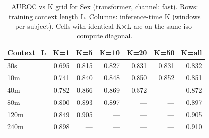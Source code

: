 \begin{table}[ht]
\centering
\caption{AUROC vs K grid for Sex (transformer, channel: fast). Rows: training context length L. Columns: inference-time K (windows per subject). Cells with identical K×L are on the same iso-compute diagonal.}
\label{tab:kgrid_sex_binary_transformer_fast}
\begin{tabular}{lrrrrrr}
\toprule
Context_L & K=1 & K=5 & K=10 & K=20 & K=50 & K=all \\
\midrule
30s & 0.695 & 0.815 & 0.827 & 0.831 & 0.831 & 0.832 \\
10m & 0.741 & 0.840 & 0.848 & 0.850 & 0.852 & 0.851 \\
40m & 0.782 & 0.866 & 0.869 & 0.872 & — & 0.872 \\
80m & 0.800 & 0.893 & 0.897 & — & — & 0.897 \\
120m & 0.849 & 0.905 & — & — & — & 0.905 \\
240m & 0.898 & — & — & — & — & 0.910 \\
\bottomrule
\end{tabular}
\end{table}